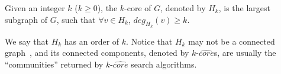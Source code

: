 \begin{definition}
\label{def:kcore}
Given an integer $k$ ($k\geq 0$), the $k$-core of $G$,
denoted by $H_{k}$, is the largest subgraph of $G$, such that $\forall v \in H_k$, $deg_{H_k}(v) \geq k$.
\end{definition}

We say that $H_k$ has an order of $k$.  Notice that $H_k$ may not be a connected graph~\cite{kcore2003}, and its connected components, denoted by $k$-$\widehat{core}$s, are usually the ``communities'' returned by $k$-$\widehat{core}$ search algorithms.

\begin{figure}[ht]
    \centering
    \mbox{
        \hspace{1ex}
        }
\end{figure}
